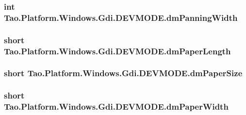 \label{struct_tao_1_1_platform_1_1_windows_1_1_gdi_1_1_d_e_v_m_o_d_e_a8508fdb2c7ebea0233a8df4bc4ff6f29}
\hypertarget{struct_tao_1_1_platform_1_1_windows_1_1_gdi_1_1_d_e_v_m_o_d_e_a247eec18a1c81a553daf778fa9fd3035}{
\subsubsection[{dmPanningWidth}]{\setlength{\rightskip}{0pt plus 5cm}int {\bf Tao.Platform.Windows.Gdi.DEVMODE.dmPanningWidth}}}
\label{struct_tao_1_1_platform_1_1_windows_1_1_gdi_1_1_d_e_v_m_o_d_e_a247eec18a1c81a553daf778fa9fd3035}
\hypertarget{struct_tao_1_1_platform_1_1_windows_1_1_gdi_1_1_d_e_v_m_o_d_e_a5c0bd03c25bfcfc269f524d245a47a7b}{
\subsubsection[{dmPaperLength}]{\setlength{\rightskip}{0pt plus 5cm}short {\bf Tao.Platform.Windows.Gdi.DEVMODE.dmPaperLength}}}
\label{struct_tao_1_1_platform_1_1_windows_1_1_gdi_1_1_d_e_v_m_o_d_e_a5c0bd03c25bfcfc269f524d245a47a7b}
\hypertarget{struct_tao_1_1_platform_1_1_windows_1_1_gdi_1_1_d_e_v_m_o_d_e_ab7b4badd168ad4ce044c2939b6f07ad6}{
\subsubsection[{dmPaperSize}]{\setlength{\rightskip}{0pt plus 5cm}short {\bf Tao.Platform.Windows.Gdi.DEVMODE.dmPaperSize}}}
\label{struct_tao_1_1_platform_1_1_windows_1_1_gdi_1_1_d_e_v_m_o_d_e_ab7b4badd168ad4ce044c2939b6f07ad6}
\hypertarget{struct_tao_1_1_platform_1_1_windows_1_1_gdi_1_1_d_e_v_m_o_d_e_a1210655f88f034e340c4135af5f46c44}{
\subsubsection[{dmPaperWidth}]{\setlength{\rightskip}{0pt plus 5cm}short {\bf Tao.Platform.Windows.Gdi.DEVMODE.dmPaperWidth}}}
